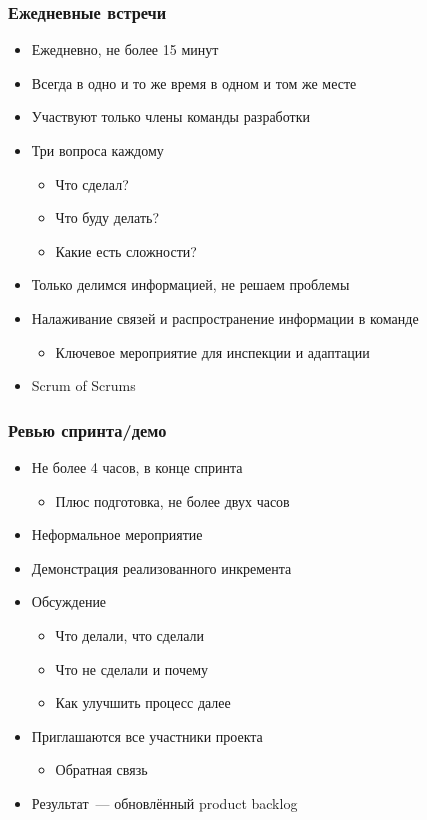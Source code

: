 \documentclass{../../slides-style}
\begin{document}
    \begin{frame}
        \frametitle{Ежедневные встречи}
        \begin{itemize}
            \item Ежедневно, не более 15 минут
            \item Всегда в одно и то же время в одном и том же месте
            \item Участвуют только члены команды разработки
            \item Три вопроса каждому
            \begin{itemize}
                \item Что сделал?
                \item Что буду делать?
                \item Какие есть сложности?
            \end{itemize}
            \item Только делимся информацией, не решаем проблемы
            \item Налаживание связей и распространение информации в команде
            \begin{itemize}
                \item Ключевое мероприятие для инспекции и адаптации
            \end{itemize}
            \item Scrum of Scrums
        \end{itemize}
    \end{frame}

    \begin{frame}
        \frametitle{Ревью спринта/демо}
        \begin{itemize}
            \item Не более 4 часов, в конце спринта
            \begin{itemize}
                \item Плюс подготовка, не более двух часов
            \end{itemize}
            \item Неформальное мероприятие
            \item Демонстрация реализованного инкремента
            \item Обсуждение
            \begin{itemize}
                \item Что делали, что сделали
                \item Что не сделали и почему
                \item Как улучшить процесс далее
            \end{itemize}
            \item Приглашаются все участники проекта
            \begin{itemize}
                \item Обратная связь
            \end{itemize}
            \item Результат~--- обновлённый product backlog
        \end{itemize}
    \end{frame}
\end{document}
